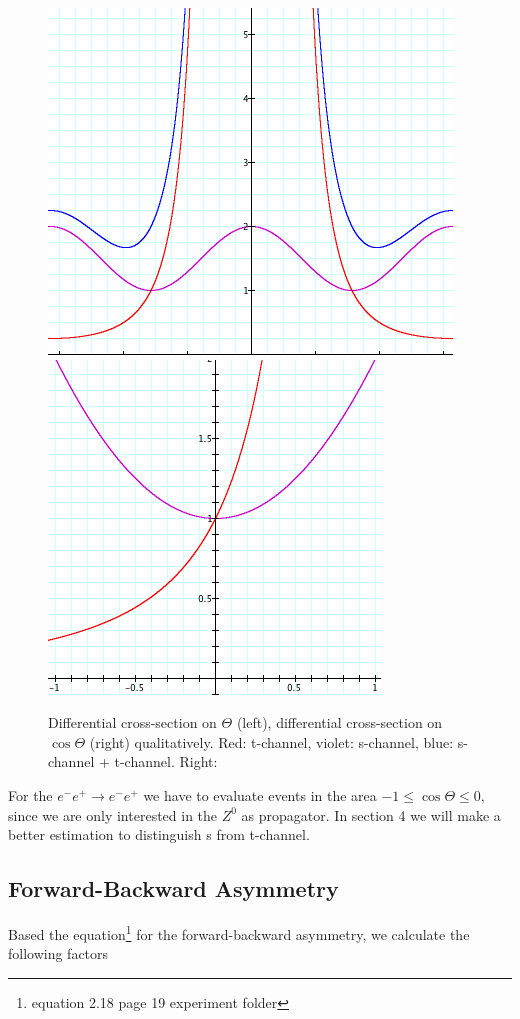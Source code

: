 \documentclass[]{article}
\begin{document}
\begin{figure}[H]
	\centering
	\includegraphics[scale=0.4]{differential-cross-section}
	\hspace{3cm}
	\includegraphics[scale=0.4]{cross-section-diff}
	
	\caption{Differential cross-section on $\Theta$ (left), differential cross-section on $\cos{\Theta}$ (right) qualitatively. Red: t-channel, violet: s-channel, blue: s-channel + t-channel. Right: }
	\label{fig:diff-cross-section}
\end{figure}
For the $e^-e^+ \rightarrow e^-e^+$ we have to evaluate events in the area $-1 \leq \cos{\Theta} \leq 0$, since we are only interested in the $Z^0$ as propagator. In section 4 we will make a better estimation to distinguish s from t-channel.

\subsection{Forward-Backward Asymmetry}
Based the equation\footnote{equation 2.18 page 19 experiment folder} for the forward-backward asymmetry, we calculate the following factors
\end{document}
